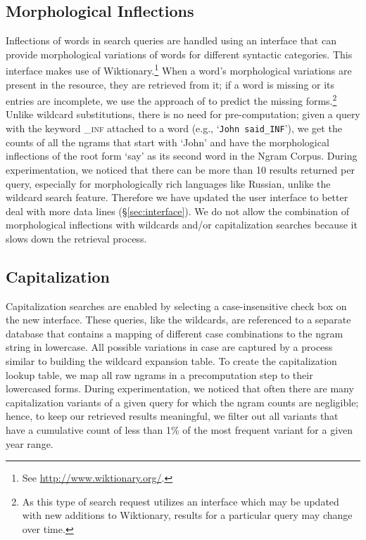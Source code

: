 \documentclass[11pt,a4paper]{article}
\newcommand{\query}[1]{\texttt{#1}}
\begin{document}
\subsection{Morphological Inflections}
Inflections of words in search queries are handled using an interface that can provide morphological variations of words for different syntactic categories. This interface makes use of Wiktionary.\footnote{See \url{http://www.wiktionary.org/}.} When a word's
morphological variations are present in the resource, they are retrieved from it; if a word is missing or its entries are incomplete, we use the approach of  to predict the missing forms.\footnote{As this type of search request utilizes an interface which may be updated with new additions to Wiktionary, results for a particular query may change over time.} Unlike wildcard substitutions, there is no need for pre-computation; given a query with the keyword \textsf{\textsc{\_inf}} attached to a word (e.g., `\query{John said\_INF}'), we get the counts of all the ngrams that start with `John' and have the morphological inflections of the root form `say' as its second word in the Ngram Corpus. During experimentation, we noticed that there can be more than 10 results returned per query, especially for morphologically rich languages like Russian, unlike the wildcard search feature. Therefore we have updated the user interface to better deal with more data lines (\S\ref{sec:interface}). We do not allow the combination of morphological inflections with wildcards and/or capitalization searches because it slows down the retrieval process.

\subsection{Capitalization}
Capitalization searches are enabled by selecting a case-insensitive check box on the new interface. These queries, like the wildcards, are referenced to a separate database that contains a mapping of different case combinations to the ngram string in lowercase. All possible variations in case are captured by a process similar to building the wildcard expansion table. To create the capitalization lookup table, we map all raw ngrams in a precomputation step to their lowercased forms. During experimentation, we noticed that often there are many capitalization variants of a given query for which the ngram counts are negligible; hence, to keep our retrieved results meaningful, we filter out all variants that have a cumulative count of less than 1\% of the most frequent variant for a given year range.
\end{document}
